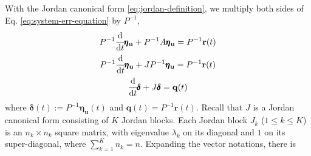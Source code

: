 \documentclass[accepted]{uai2023}
\newcommand{\vect}[1]{\mathbf{#1}}
\newcommand{\dt}[1]{\cfrac{\mathrm{d} #1}{\mathrm{d} t}}
\newcommand{\Err}{\eta}
\begin{document}
    With the Jordan canonical form \ref{eq:jordan-definition}, we multiply both sides of Eq. \ref{eq:system-err-equation} by $P^{-1}$,
    \begin{gather}
        P^{-1}\dt{}\pmb{\Err}_{\vect{u}} + P^{-1}A \pmb{\Err}_{\vect{u}} = P^{-1}\vect{r}(t) \\
        P^{-1}\dt{}\pmb{\Err}_{\vect{u}} + JP^{-1} \pmb{\Err}_{\vect{u}} = P^{-1}\vect{r}(t) \\
        \dt{}\pmb{\delta} + J \pmb{\delta}  = \vect{q}(t) 
    \end{gather}
    where $\pmb{\delta}(t) := P^{-1}\pmb{\Err}_{\vect{u}}(t)$ and $\vect{q}(t) = P^{-1}\vect{r}(t)$. Recall that $J$ is a Jordan canonical form consisting of $K$ Jordan blocks. Each Jordan block $J_k$ ($1\leq k \leq K$) is an $n_k \times n_k$ square matrix, with eigenvalue $\lambda_k$ on its diagonal and $1$ on its super-diagonal, where $\sum_{k=1}^{K} n_k = n$. Expanding the vector notations, there is 
    \begingroup
        \newcommand{\?}[1]{\multicolumn{1}{c|}{#1}}
\end{document}
